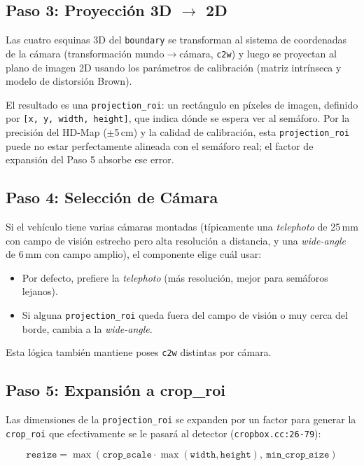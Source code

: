 \subsection{Paso 3: Proyección 3D $\to$ 2D}

Las cuatro esquinas 3D del \texttt{boundary} se transforman al sistema de coordenadas de la cámara (transformación mundo$\to$cámara, \texttt{c2w}) y luego se proyectan al plano de imagen 2D usando los parámetros de calibración (matriz intrínseca y modelo de distorsión Brown).

El resultado es una \texttt{projection\_roi}: un rectángulo en píxeles de imagen, definido por \texttt{[x, y, width, height]}, que indica dónde se espera ver al semáforo. Por la precisión del HD-Map ($\pm$5\,cm) y la calidad de calibración, esta \texttt{projection\_roi} puede no estar perfectamente alineada con el semáforo real; el factor de expansión del Paso 5 absorbe ese error.

\subsection{Paso 4: Selección de Cámara}

Si el vehículo tiene varias cámaras montadas (típicamente una \textit{telephoto} de 25\,mm con campo de visión estrecho pero alta resolución a distancia, y una \textit{wide-angle} de 6\,mm con campo amplio), el componente elige cuál usar:

\begin{itemize}
    \item Por defecto, prefiere la \textit{telephoto} (más resolución, mejor para semáforos lejanos).
    \item Si alguna \texttt{projection\_roi} queda fuera del campo de visión o muy cerca del borde, cambia a la \textit{wide-angle}.
\end{itemize}

Esta lógica también mantiene poses \texttt{c2w} distintas por cámara.

\subsection{Paso 5: Expansión a crop\_roi}

Las dimensiones de la \texttt{projection\_roi} se expanden por un factor para generar la \texttt{crop\_roi} que efectivamente se le pasará al detector (\texttt{cropbox.cc:26-79}):

\begin{equation}
\texttt{resize} = \max\left(\texttt{crop\_scale} \cdot \max(\texttt{width}, \texttt{height}),\ \texttt{min\_crop\_size}\right)
\end{equation}

